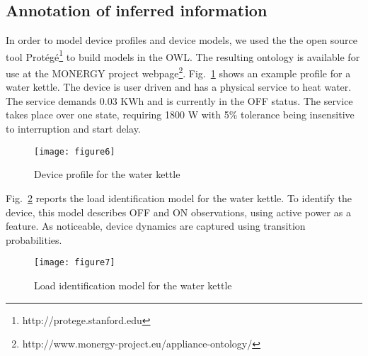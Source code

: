\documentclass{article}
\begin{document}
\subsection{Annotation of inferred information}
In order to model device profiles and device models, we used the the open source tool Prot\'eg\'e\footnote{http://protege.stanford.edu} to build models in the \ac{OWL}.
The resulting ontology is available for use at the MONERGY project webpage\footnote{http://www.monergy-project.eu/appliance-ontology/}.
Fig.~\ref{fig:datasheetkettle} shows an example profile for a water kettle.
The device is user driven and has a physical service to heat water.
The service demands 0.03 KWh and is currently in the OFF status.
The service takes place over one state, requiring 1800 W with 5\% tolerance being insensitive to interruption and start delay.
\begin{figure}[h!]
\centering
\texttt{[image: figure6]}
\caption{Device profile for the water kettle}
\label{fig:datasheetkettle}
\end{figure}
Fig.~\ref{fig:nilmmodelkettle} reports the load identification model for the water kettle.
To identify the device, this model describes OFF and ON observations, using active power as a feature.
As noticeable, device dynamics are captured using transition probabilities.
\begin{figure}[h!]
\centering
\texttt{[image: figure7]}
\caption{Load identification model for the water kettle}
\label{fig:nilmmodelkettle}
\end{figure}
\end{document}
